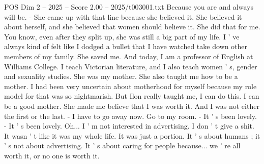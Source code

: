 \begin{textsample}{POS Dim 2 – 2025 – Score 2.00 – 2025/t003001.txt}
Because you are and always will be. - She came up with that line because she believed it.
She believed it about herself, and she believed that women should believe it.
She did that for me.
You know, even after they split up, she was still a big part of my life.
I ' ve always kind of felt like I dodged a bullet that I have watched take down other members of my family.
She saved me.
And today, I am a professor of English at Williams College.
I teach Victorian literature, and I also teach women ' s, gender and sexuality studies.
She was my mother.
She also taught me how to be a mother.
I had been very uncertain about motherhood for myself because my role model for that was so nightmarish.
But Ilon really taught me, I can do this.
I can be a good mother.
She made me believe that I was worth it.
And I was not either the first or the last. - I have to go away now.
Go to my room. - It ' s been lovely. - It ' s been lovely.
Oh...
I ' m not interested in advertising.
I don ' t give a shit.
It wasn ' t like it was my whole life.
It was just a portion.
It ' s about humans ; it ' s not about advertising.
It ' s about caring for people because... we ' re all worth it, or no one is worth it.

\end{textsample}
